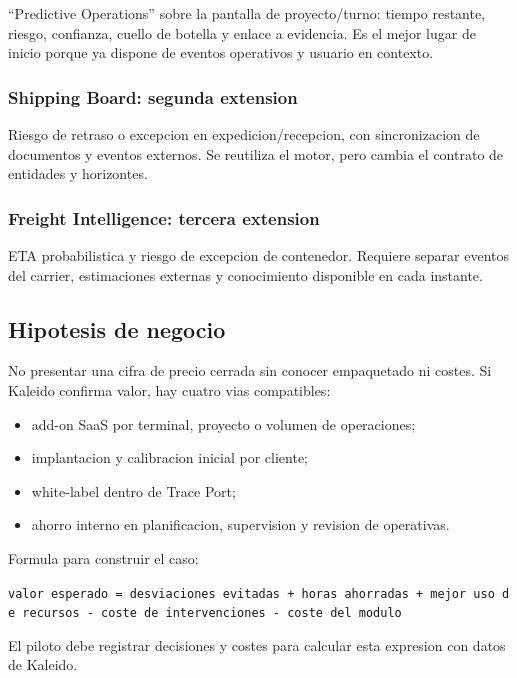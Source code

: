 \documentclass[
  spanish,
  10pt,
  a4paper,
]{article}
\providecommand{\tightlist}{%
  \setlength{\itemsep}{0pt}\setlength{\parskip}{0pt}}
\begin{document}
``Predictive Operations'' sobre la pantalla de proyecto/turno: tiempo
restante, riesgo, confianza, cuello de botella y enlace a evidencia. Es
el mejor lugar de inicio porque ya dispone de eventos operativos y
usuario en contexto.

\subsubsection{Shipping Board: segunda
extension}\label{shipping-board-segunda-extension}

Riesgo de retraso o excepcion en expedicion/recepcion, con
sincronizacion de documentos y eventos externos. Se reutiliza el motor,
pero cambia el contrato de entidades y horizontes.

\subsubsection{Freight Intelligence: tercera
extension}\label{freight-intelligence-tercera-extension}

ETA probabilistica y riesgo de excepcion de contenedor. Requiere separar
eventos del carrier, estimaciones externas y conocimiento disponible en
cada instante.

\subsection{Hipotesis de negocio}\label{hipotesis-de-negocio}

No presentar una cifra de precio cerrada sin conocer empaquetado ni
costes. Si Kaleido confirma valor, hay cuatro vias compatibles:

\begin{itemize}
\tightlist
\item
  add-on SaaS por terminal, proyecto o volumen de operaciones;
\item
  implantacion y calibracion inicial por cliente;
\item
  white-label dentro de Trace Port;
\item
  ahorro interno en planificacion, supervision y revision de operativas.
\end{itemize}

Formula para construir el caso:

\texttt{valor\ esperado\ =\ desviaciones\ evitadas\ +\ horas\ ahorradas\ +\ mejor\ uso\ de\ recursos\ -\ coste\ de\ intervenciones\ -\ coste\ del\ modulo}

El piloto debe registrar decisiones y costes para calcular esta
expresion con datos de Kaleido.
\end{document}
